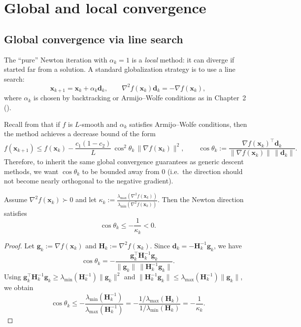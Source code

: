 \section{Global and local convergence}
\subsection{Global convergence via line search}
\label{sec:ch3-global-conv}
The ``pure'' Newton iteration with $\alpha_k=1$ is a \emph{local} method: it can
diverge if started far from a solution. A standard globalization strategy is to
use a line search:
\begin{equation}
  \label{eq:ch3-newton-linesearch}
  \mathbf{x}_{k+1}=\mathbf{x}_k+\alpha_k \mathbf{d}_k,
  \qquad
  \nabla^2 f(\mathbf{x}_k)\mathbf{d}_k=-\nabla f(\mathbf{x}_k),
\end{equation}
where $\alpha_k$ is chosen by backtracking or Armijo--Wolfe conditions as in
Chapter~2 ().

Recall from  that if $f$ is $L$-smooth and $\alpha_k$
satisfies Armijo--Wolfe conditions, then the method achieves a decrease bound of
the form
\[
  f(\mathbf{x}_{k+1})\le f(\mathbf{x}_k)
  -\frac{c_1(1-c_2)}{L}\,\cos^2\theta_k\,\|\nabla f(\mathbf{x}_k)\|^2,
  \qquad
  \cos\theta_k:=\frac{\nabla f(\mathbf{x}_k)^\top\mathbf{d}_k}
  {\|\nabla f(\mathbf{x}_k)\|\,\|\mathbf{d}_k\|}.
\]
Therefore, to inherit the same global convergence guarantees as generic descent
methods, we want $\cos\theta_k$ to be bounded away from $0$ (i.e.\ the direction
should not become nearly orthogonal to the negative gradient).

\begin{claim}
\label{clm:ch3-newton-angle}
Assume $\nabla^2 f(\mathbf{x}_k)\succ 0$ and let
$\kappa_k:=\frac{\lambda_{\max}(\nabla^2 f(\mathbf{x}_k))}
{\lambda_{\min}(\nabla^2 f(\mathbf{x}_k))}$. Then the Newton direction satisfies
\[
  \cos\theta_k \le -\frac{1}{\kappa_k}<0.
\]
\end{claim}
\begin{proof}
Let $\mathbf{g}_k:=\nabla f(\mathbf{x}_k)$ and
$\mathbf{H}_k:=\nabla^2 f(\mathbf{x}_k)$. Since
$\mathbf{d}_k=-\mathbf{H}_k^{-1}\mathbf{g}_k$, we have
\[
  \cos\theta_k
  =-\frac{\mathbf{g}_k^\top \mathbf{H}_k^{-1}\mathbf{g}_k}
  {\|\mathbf{g}_k\|\,\|\mathbf{H}_k^{-1}\mathbf{g}_k\|}.
\]
Using $\mathbf{g}_k^\top \mathbf{H}_k^{-1}\mathbf{g}_k
\ge \lambda_{\min}(\mathbf{H}_k^{-1})\|\mathbf{g}_k\|^2$
and $\|\mathbf{H}_k^{-1}\mathbf{g}_k\|
\le \lambda_{\max}(\mathbf{H}_k^{-1})\|\mathbf{g}_k\|$, we obtain
\[
  \cos\theta_k
  \le -\frac{\lambda_{\min}(\mathbf{H}_k^{-1})}{\lambda_{\max}(\mathbf{H}_k^{-1})}
  =-\frac{1/\lambda_{\max}(\mathbf{H}_k)}{1/\lambda_{\min}(\mathbf{H}_k)}
  =-\frac{1}{\kappa_k}.
\]
\end{proof}

